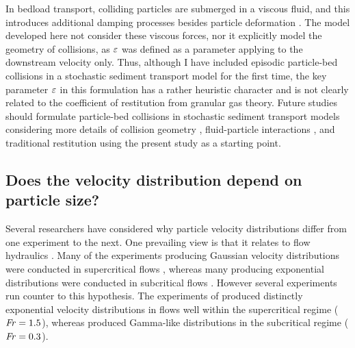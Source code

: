 In bedload transport, colliding particles are submerged in a viscous fluid, and this introduces additional damping processes besides particle deformation \citep{Joseph2001,Yang2006,Schmeeckle2001}.
The model developed here \DIFdelbegin {}\DIFdelend \DIFaddbegin {}\DIFaddend not consider these viscous forces, nor \DIFdelbegin {}\DIFdelend \DIFaddbegin {}\DIFaddend it explicitly model the geometry of collisions, as $\varepsilon$ was defined as a parameter applying to the downstream velocity only.
Thus, although I have included episodic particle-bed collisions in a stochastic sediment transport model for the first time, the key parameter \DIFdelbegin \DIFdel{(}\DIFdelend $\varepsilon$ \DIFdelbegin \DIFdel{) }\DIFdelend in this formulation has a rather heuristic character and is not clearly related to the coefficient of restitution from granular gas theory.
Future studies should formulate particle-bed collisions in stochastic sediment transport models considering more details of collision geometry \citep{Sekine1992}, fluid-particle interactions \citep{Marshall2011}, and traditional restitution \citep{Brach1989} using the \DIFaddbegin {}\DIFaddend present study as a starting point. 

\subsection{Does the velocity distribution depend on particle size?}

Several researchers have considered why particle velocity distributions differ from one experiment to the next.
One prevailing view is that it relates to flow hydraulics \citep{Wu2020}. Many of the experiments producing Gaussian velocity distributions were conducted in supercritical flows \citep[e.g.][]{Heyman2016,Martin2012,Ancey2014}, whereas many producing exponential distributions were conducted in subcritical flows \citep[e.g.][]{Fathel2015,Charru2004,Seizilles2014}.
However several experiments run counter to this hypothesis.
The experiments of \citet{Lajeunesse2010} produced distinctly exponential velocity distributions in flows well within the supercritical regime ($\mbox{\textit{Fr}}=1.5$), whereas \citet{Liu2019} produced Gamma-like distributions in the subcritical regime ($\mbox{\textit{Fr}}=0.3$).

